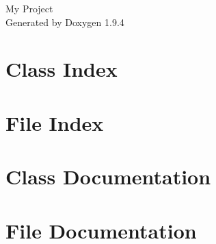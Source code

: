 \documentclass[twoside]{book}
\newcommand{\+}{\discretionary{\mbox{\scriptsize$\hookleftarrow$}}{}{}}
\newcommand{\clearemptydoublepage}{%
    \newpage{\pagestyle{empty}\cleardoublepage}%
  }
\begin{document}
  \raggedbottom
    \hypersetup{pageanchor=false,
                bookmarksnumbered=true,
                pdfencoding=unicode
               }
  \begin{titlepage}
  \vspace*{7cm}
  \begin{center}%
  {\Large My Project}\\
  \vspace*{1cm}
  {\large Generated by Doxygen 1.9.4}\\
  \end{center}
  \end{titlepage}
  \clearemptydoublepage
  \tableofcontents
  \clearemptydoublepage
  \hypersetup{pageanchor=true}
\chapter{Class Index}

\chapter{File Index}

\chapter{Class Documentation}







\chapter{File Documentation}






















  \backmatter
  \newpage
  \clearemptydoublepage
  \printindex
\end{document}
